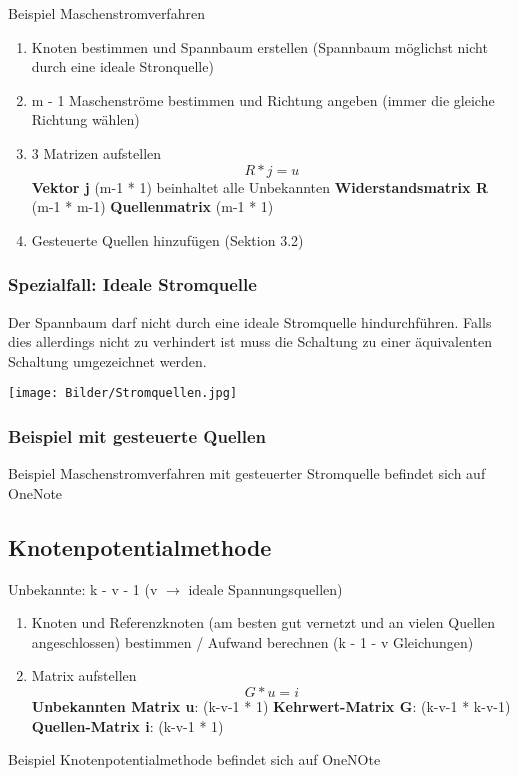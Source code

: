\documentclass{article}
\begin{document}
Beispiel Maschenstromverfahren
\begin{enumerate}
    \item Knoten bestimmen und Spannbaum erstellen (Spannbaum möglichst nicht durch eine ideale Stronquelle)
    \item m - 1 Maschenströme bestimmen und Richtung angeben (immer die gleiche Richtung wählen)
    \item 3 Matrizen aufstellen
    \begin{equation}
        R * j = u
    \end{equation}
    \subitem \textbf{Vektor j} (m-1 * 1) beinhaltet alle Unbekannten
    \subitem \textbf{Widerstandsmatrix R} (m-1 * m-1)
    \subitem \textbf{Quellenmatrix} (m-1 * 1) 
    \item Gesteuerte Quellen hinzufügen (Sektion 3.2)
\end{enumerate}
\subsubsection{Spezialfall: Ideale Stromquelle}
Der Spannbaum darf nicht durch eine ideale Stromquelle hindurchführen. Falls dies allerdings nicht zu verhindert ist muss die Schaltung zu einer äquivalenten Schaltung umgezeichnet werden. \\

\begin{center}
    \texttt{[image: Bilder/Stromquellen.jpg]}
\end{center}
\subsubsection{Beispiel mit gesteuerte Quellen}

Beispiel Maschenstromverfahren mit gesteuerter Stromquelle befindet sich auf OneNote

\subsection{Knotenpotentialmethode}
Unbekannte: k - v - 1 (v $\rightarrow$ ideale Spannungsquellen) \\
\begin{enumerate}
    \item Knoten und Referenzknoten (am besten gut vernetzt und an vielen Quellen angeschlossen) bestimmen / Aufwand berechnen (k - 1 - v Gleichungen)
    \item Matrix aufstellen
    \begin{equation}
        G * u = i
    \end{equation}
    \subitem \textbf{Unbekannten Matrix u}: (k-v-1 * 1) 
    \subitem \textbf{Kehrwert-Matrix G}: (k-v-1 * k-v-1)
    \subitem \textbf{Quellen-Matrix i}: (k-v-1 * 1)
    \end{enumerate}
    Beispiel Knotenpotentialmethode befindet sich auf OneNOte
    
\end{document}
